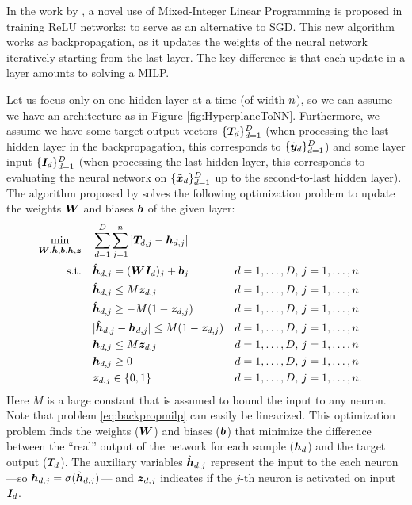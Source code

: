 In the work by \cite{goebbelstraining2021}, a novel use of Mixed-Integer Linear Programming is proposed in training ReLU networks: to serve as an alternative to SGD. This new algorithm works as backpropagation, as it updates the weights of the neural network iteratively starting from the last layer. The key difference is that each update in a layer amounts to solving a MILP.

Let us focus only on one hidden layer at a time (of width $n$), so we can assume we have an architecture as in Figure \ref{fig:HyperplaneToNN}. Furthermore, we assume we have some target output vectors $\{{\bm{T}}_d\}_{d=1}^D$ (when processing the last hidden layer in the backpropagation, this corresponds to $\{\tilde{{\bm{y}}}_d\}_{d=1}^D$) and some layer input $\{{\bm{I}}_d\}_{d=1}^D$ (when processing the last hidden layer, this corresponds to evaluating the neural network on $\{\tilde{{\bm{x}}}_d\}_{d=1}^D$ up to the second-to-last hidden layer). The algorithm proposed by \cite{goebbelstraining2021} solves the following optimization problem to update the weights ${\bm{W}}$ and biases ${\bm{b}}$ of the given layer:
%
\begin{subequations}
\label{eq:backpropmilp}
\begin{align}
    \min_{{\bm{W}},\hat{{\bm{h}}},{\bm{b}},{\bm{h}},{\bm{z}}} \quad & \sum_{d=1}^D \sum_{j=1}^n |{\bm{T}}_{d,j} - {\bm{h}}_{d,j}| \\
    \text{s.t.}\quad & \hat{{\bm{h}}}_{d,j} = ({\bm{W}} {\bm{I}}_d)_j + {\bm{b}}_j  && d=1,\ldots,D,\, j=1,\ldots,n\\
    &\hat{{\bm{h}}}_{d,j} \leq M{\bm{z}}_{d,j} && d=1,\ldots,D,\, j=1,\ldots,n \\ 
    &\hat{{\bm{h}}}_{d,j} \geq -M(1-{\bm{z}}_{d,j}) && d=1,\ldots,D,\, j=1,\ldots,n \\
    &|\hat{{\bm{h}}}_{d,j}-{\bm{h}}_{d,j}| \leq M(1-{\bm{z}}_{d,j}) && d=1,\ldots,D,\, j=1,\ldots,n \\ 
    &{\bm{h}}_{d,j} \leq M{\bm{z}}_{d,j} && d=1,\ldots,D,\, j=1,\ldots,n \\
    & {\bm{h}}_{d,j} \geq 0  && d=1,\ldots,D,\, j=1,\ldots,n \\
    & {\bm{z}}_{d,j} \in \{0,1\} && d=1,\ldots,D,\, j=1,\ldots,n.
\end{align}
\end{subequations}
%
Here $M$ is a large constant that is assumed to bound the input to any neuron. Note that problem \eqref{eq:backpropmilp} can easily be linearized. 
%
This optimization problem finds the weights (${\bm{W}}$) and biases (${\bm{b}}$) that minimize the difference between the ``real'' output of the network for each sample (${\bm{h}}_d$) and the target output (${\bm{T}}_d$). The auxiliary variables $\hat{{\bm{h}}}_{d,j}$ represent the input to the each neuron ---so ${\bm{h}}_{d,j} = \sigma(\hat{{\bm{h}}}_{d,j})$--- and ${\bm{z}}_{d,j}$ indicates if the $j$-th neuron is activated on input ${\bm{I}}_{d}$.

